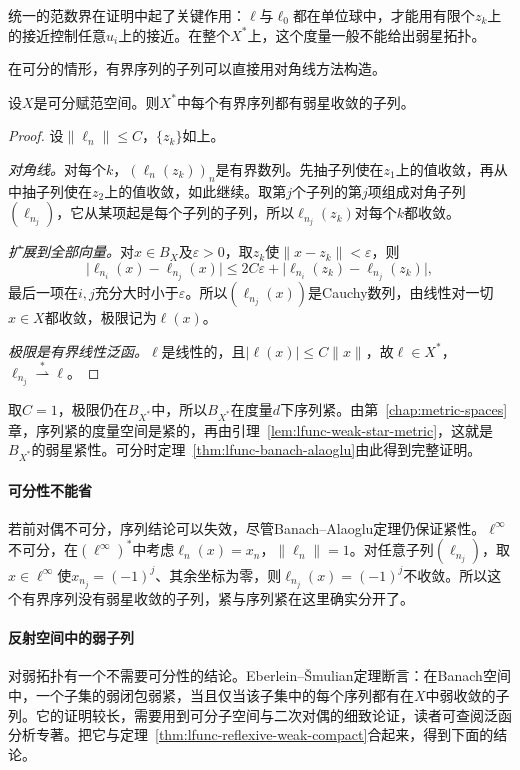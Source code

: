统一的范数界在证明中起了关键作用：$\ell$与$\ell_0$都在单位球中，才能用有限个$z_k$上的接近控制任意$u_i$上的接近。在整个$X^*$上，这个度量一般不能给出弱星拓扑。

在可分的情形，有界序列的子列可以直接用对角线方法构造。

\begin{theorem}[可分前对偶下的弱星子列]
\label{thm:lfunc-weak-star-subsequence}
设$X$是可分赋范空间。则$X^*$中每个有界序列都有弱星收敛的子列。
\end{theorem}

\begin{proof}
设$\lVert\ell_n\rVert\leq C$，$\{z_k\}$如上。

\emph{对角线。}对每个$k$，$(\ell_n(z_k))_n$是有界数列。先抽子列使在$z_1$上的值收敛，再从中抽子列使在$z_2$上的值收敛，如此继续。取第$j$个子列的第$j$项组成对角子列$(\ell_{n_j})$，它从某项起是每个子列的子列，所以$\ell_{n_j}(z_k)$对每个$k$都收敛。

\emph{扩展到全部向量。}对$x\in B_X$及$\varepsilon>0$，取$z_k$使$\lVert x-z_k\rVert<\varepsilon$，则
\[
\lvert\ell_{n_i}(x)-\ell_{n_j}(x)\rvert\leq2C\varepsilon+\lvert\ell_{n_i}(z_k)-\ell_{n_j}(z_k)\rvert ,
\]
最后一项在$i,j$充分大时小于$\varepsilon$。所以$(\ell_{n_j}(x))$是Cauchy数列，由线性对一切$x\in X$都收敛，极限记为$\ell(x)$。

\emph{极限是有界线性泛函。}$\ell$是线性的，且$\lvert\ell(x)\rvert\leq C\lVert x\rVert$，故$\ell\in X^*$，$\ell_{n_j}\overset{*}{\rightharpoonup}\ell$。
\end{proof}

取$C=1$，极限仍在$B_{X^*}$中，所以$B_{X^*}$在度量$d$下序列紧。由第~\ref{chap:metric-spaces}章，序列紧的度量空间是紧的，再由引理~\ref{lem:lfunc-weak-star-metric}，这就是$B_{X^*}$的弱星紧性。可分时定理~\ref{thm:lfunc-banach-alaoglu}由此得到完整证明。

\paragraph{可分性不能省}
若前对偶不可分，序列结论可以失效，尽管Banach--Alaoglu定理仍保证紧性。$\ell^\infty$不可分，在$(\ell^\infty)^*$中考虑$\ell_n(x)=x_n$，$\lVert\ell_n\rVert=1$。对任意子列$(\ell_{n_j})$，取$x\in\ell^\infty$使$x_{n_j}=(-1)^j$、其余坐标为零，则$\ell_{n_j}(x)=(-1)^j$不收敛。所以这个有界序列没有弱星收敛的子列，紧与序列紧在这里确实分开了。

\paragraph{反射空间中的弱子列}
对弱拓扑有一个不需要可分性的结论。Eberlein--\v{S}mulian定理断言：在Banach空间中，一个子集的弱闭包弱紧，当且仅当该子集中的每个序列都有在$X$中弱收敛的子列。它的证明较长，需要用到可分子空间与二次对偶的细致论证，读者可查阅泛函分析专著。把它与定理~\ref{thm:lfunc-reflexive-weak-compact}合起来，得到下面的结论。

